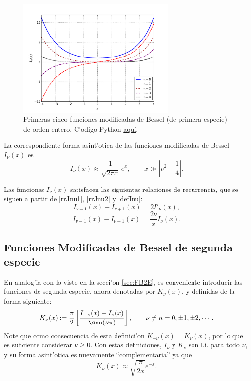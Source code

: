 \begin{figure}[H]
\centering
\includegraphics[angle=0,width=0.7\textwidth]{figs/fig-Bessel-I.pdf}
\caption{Primeras cinco funciones modificadas de Bessel (de primera especie) de orden entero. C'odigo Python \href{https://github.com/gfrubi/FM2/blob/master/figuras-editables/fig-Bessel.py}{aqu\'i}.}
\label{fig-In}
\end{figure}
La correspondiente forma asint'otica de las funciones modificadas de Bessel $I_\nu(x)$ es
\begin{equation}
I_\nu(x) \approx \frac{1}{\sqrt{2\pi x}}\,e^x, \qquad x\gg\left|\nu^2-\frac{1}{4}\right|.
\end{equation}

Las funciones $I_\nu(x)$ satisfacen las siguientes relaciones de recurrencia, que se siguen a partir de \eqref{rrJnu1}, \eqref{rrJnu2} y \eqref{defInu}:
\begin{equation}\label{rrInu1}
I_{\nu-1}(x)+I_{\nu+1}(x)=2I'_\nu(x),
\end{equation}
\begin{equation}\label{rrInu2}
I_{\nu-1}(x)-I_{\nu+1}(x)=\frac{2\nu}{x}I_\nu(x).
\end{equation}

\subsection{Funciones Modificadas de Bessel de segunda especie}
En analog'ia con lo visto en la secci'on \ref{sec:FB2E}, es conveniente introducir las funciones de segunda especie, ahora denotadas por $K_\nu(x)$, y definidas de la forma siguiente:
\begin{equation}\label{defKnu}
K_\nu(x) := \frac{\pi}{2}\left[\frac{I_{-\nu}(x)-I_\nu(x)}{\sen(\nu\pi)}\right], \qquad \nu\neq n=0,\pm 1,\pm 2, \cdots.
\end{equation}
Note que como consecuencia de esta definici'on $K_{-\nu}(x)=K_\nu(x)$, por lo que es suficiente considerar $\nu\ge 0$.
Con estas definiciones, $I_\nu$ y $K_\nu$ son l.i. para todo $\nu$, y su forma asint'otica es nuevamente ``complementaria'' ya que
\begin{equation}
K_\nu(x) \approx \sqrt{\frac{\pi}{2x}} e^{-x}.
\end{equation}

